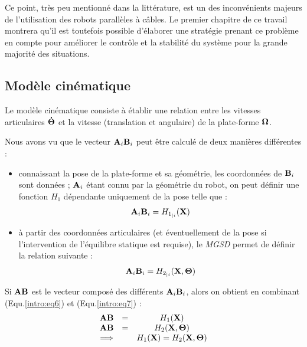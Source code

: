 Ce point, très peu mentionné dans la littérature, est un des inconvénients 
majeurs de l'utilisation des robots parallèles à câbles. Le premier chapitre de 
ce travail montrera qu'il est toutefois possible d'élaborer une stratégie 
prenant ce problème en compte pour améliorer le contrôle et la stabilité du 
système pour la grande majorité des situations.

\subsection{Modèle cinématique}\label{chap0-1-5}

Le modèle cinématique consiste à établir une relation entre les 
vitesses articulaires ${\bf \dot \Theta}$ et la vitesse (translation et 
angulaire) de la plate-forme $\bf \Omega$.

Nous avons vu que le vecteur ${\bf A}_i{\bf B}_i$ peut être calculé de deux 
manières différentes :
\begin{itemize}
 \item connaissant la pose de la plate-forme et sa géométrie, les coordonnées 
de 
${\bf B}_i$ sont données ; ${\bf A}_i$ étant connu par la géométrie du robot, 
on 
peut définir une fonction $H_1$ dépendante uniquement de la pose telle que :
\begin{equation}
{\bf A}_i{\bf B}_i = H_{1_{|i}}({\bf X})
\label{intro:eq6}
\end{equation}
 \item à partir des coordonnées articulaires (et éventuellement de la pose si 
l'intervention de l'équilibre statique est requise), le {\it MGSD} permet de 
définir la relation suivante :
\begin{equation}
{\bf A}_i{\bf B}_i = H_{2_{|i}}({\bf X}, {\bf \Theta})
\label{intro:eq7}
\end{equation}
\end{itemize}
 
Si ${\bf AB}$ est le vecteur composé des différents ${\bf A}_i{\bf B}_i$, alors 
on obtient en combinant (Equ.\ref{intro:eq6}) et (Equ.\ref{intro:eq7}) :
\begin{equation}
\begin{matrix}
{\bf AB} &=& H_1({\bf X}) \\
{\bf AB} &=& H_2({\bf X}, {\bf \Theta}) \\
\Longrightarrow & & H_1({\bf X}) = H_2({\bf X}, {\bf \Theta})
\end{matrix}
\label{intro:eq8}
\end{equation}

